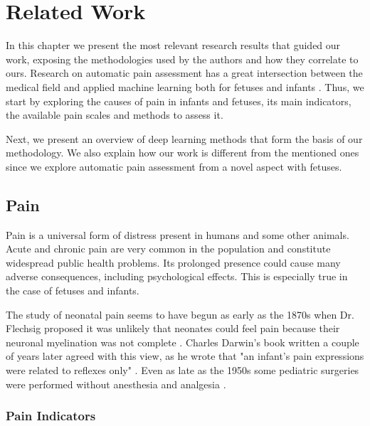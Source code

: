 \chapter{Related Work}

In this chapter we present the most relevant research results that guided our work, exposing the methodologies used by the authors and how they correlate to ours. Research on automatic pain assessment has a great intersection between the medical field and applied machine learning both for fetuses and infants \citep{ZamzmiPGKSA16, Bellieni2012}. Thus, we start by exploring the causes of pain in infants and fetuses, its main indicators, the available pain scales and methods to assess it. 

Next, we present an overview of deep learning methods that form the basis of our methodology. We also explain how our work is different from the mentioned ones since we explore automatic pain assessment from a novel aspect with fetuses.

\section{Pain}

Pain is a universal form of distress present in humans and some other animals. Acute and chronic pain are very common in the population and constitute widespread public health problems. Its prolonged presence could cause many adverse consequences, including psychological effects. This is especially true in the case of fetuses and infants.

The study of neonatal pain seems to have begun as early as the 1870s when Dr. Flechsig proposed it was unlikely that neonates could feel pain because their neuronal myelination was not complete \citep{cope1998neonatal}. Charles Darwin's book written a couple of years later agreed with this view, as he wrote that "an infant's pain expressions were related to reflexes only" \citep{darwin1872expression}. Even as late as the 1950s some pediatric surgeries were performed without anesthesia and analgesia \citep{cope1998neonatal}.


\subsection{Pain Indicators}

